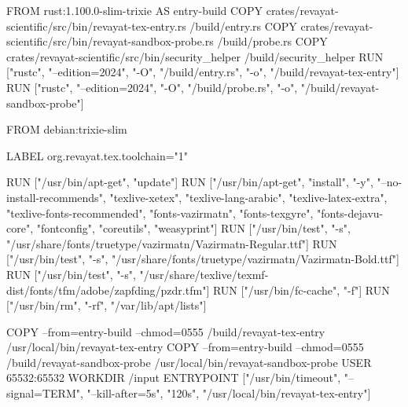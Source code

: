 FROM rust:1.100.0-slim-trixie AS entry-build
COPY crates/revayat-scientific/src/bin/revayat-tex-entry.rs /build/entry.rs
COPY crates/revayat-scientific/src/bin/revayat-sandbox-probe.rs /build/probe.rs
COPY crates/revayat-scientific/src/bin/security_helper /build/security_helper
RUN ["rustc", "--edition=2024", "-O", "/build/entry.rs", "-o", "/build/revayat-tex-entry"]
RUN ["rustc", "--edition=2024", "-O", "/build/probe.rs", "-o", "/build/revayat-sandbox-probe"]

FROM debian:trixie-slim

LABEL org.revayat.tex.toolchain="1"

RUN ["/usr/bin/apt-get", "update"]
RUN ["/usr/bin/apt-get", "install", "-y", "--no-install-recommends", "texlive-xetex", "texlive-lang-arabic", "texlive-latex-extra", "texlive-fonts-recommended", "fonts-vazirmatn", "fonts-texgyre", "fonts-dejavu-core", "fontconfig", "coreutils", "weasyprint"]
RUN ["/usr/bin/test", "-s", "/usr/share/fonts/truetype/vazirmatn/Vazirmatn-Regular.ttf"]
RUN ["/usr/bin/test", "-s", "/usr/share/fonts/truetype/vazirmatn/Vazirmatn-Bold.ttf"]
RUN ["/usr/bin/test", "-s", "/usr/share/texlive/texmf-dist/fonts/tfm/adobe/zapfding/pzdr.tfm"]
RUN ["/usr/bin/fc-cache", "-f"]
RUN ["/usr/bin/rm", "-rf", "/var/lib/apt/lists"]

COPY --from=entry-build --chmod=0555 /build/revayat-tex-entry /usr/local/bin/revayat-tex-entry
COPY --from=entry-build --chmod=0555 /build/revayat-sandbox-probe /usr/local/bin/revayat-sandbox-probe
USER 65532:65532
WORKDIR /input
ENTRYPOINT ["/usr/bin/timeout", "--signal=TERM", "--kill-after=5s", "120s", "/usr/local/bin/revayat-tex-entry"]
